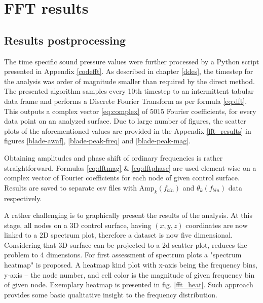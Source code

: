 
\section{FFT results} \label{fft}

\subsection{Results postprocessing} \label{fft_res_prep}
The time specific sound pressure values were further processed by a Python script presented in Appendix \ref{codefft}. As described in chapter \ref{ddes}, the timestep for the analysis was order of magnitude smaller than required by the direct method. The presented algorithm samples every 10th timestep to an intermittent tabular data frame and performs a Discrete Fourier Transform as per formula \ref{eq:dft}. This outputs a complex vector \ref{eq:complex} of 5015 Fourier coefficients, for every data point on an analyzed surface. Due to large number of figures, the scatter plots of the aforementioned values are provided in the Appendix \ref{fft_results} in figures \ref{blade-awaf}, \ref{blade-peak-freq} and \ref{blade-peak-mag}.


Obtaining amplitudes and phase shift of ordinary frequencies is rather straightforward. Formulas \ref{eq:dftmag} \& \ref{eq:dftphase} are used element-wise on a complex vector of Fourier coefficients for each node of given control surface. Results are saved to separate csv files with $\text{Amp}_k(f_{bin})$ and $\theta_k(f_{bin})$ data respectively.

A rather challenging is to graphically present the results of the analysis. At this stage, all nodes on a 3D control surface, having $(x, y, z)$ coordinates are now linked to a 2D spectrum plot, therefore a dataset is now five dimensional. Considering that 3D surface can be projected to a 2d scatter plot, reduces the problem to 4 dimensions. For first assessment of spectrum plots a "spectrum heatmap" is proposed. A heatmap kind plot with x-axis being the frequency bins, y-axis -- the node number, and cell color is the magnitude of given frequency bin of given node. Exemplary heatmap is presented in fig. \ref{fft_heat}. Such approach provides some basic qualitative insight to the frequency distribution.

